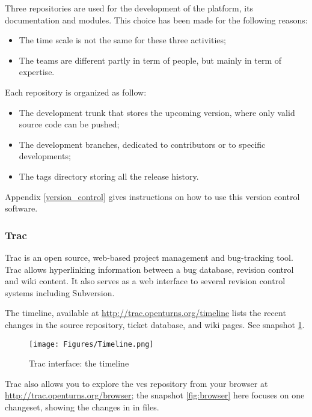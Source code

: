 Three repositories are used for the development of the platform, its documentation and modules. This choice has been made for the following reasons:
\begin{itemize}
\item The time scale is not the same for these three activities;
\item The teams are different partly in term of people, but mainly in term of expertise.
\end{itemize}

Each repository is organized as follow:
\begin{itemize}
\item The development trunk that stores the upcoming version, where only valid source code can be pushed;
\item The development branches, dedicated to contributors or to specific developments;
\item The tags directory storing all the release history.
\end{itemize}

Appendix \ref{version_control} gives instructions on how to use this version control software.

\subsubsection{Trac}

Trac is an open source, web-based project management and bug-tracking tool. Trac allows hyperlinking information between a bug database, revision control and wiki content. It also serves as a web interface to several revision control systems including Subversion.

The timeline, available at \url{http://trac.openturns.org/timeline} lists the recent changes in the source repository, ticket database, and wiki pages. See snapshot \ref{fig:timeline}.

\begin{figure}[ht]
\begin{center}
\texttt{[image: Figures/Timeline.png]}
\caption{Trac interface: the timeline}\label{fig:timeline}
\end{center}
\end{figure}

Trac also allows you to explore the vcs repository from your browser at \url{http://trac.openturns.org/browser}; the snapshot \ref{fig:browser} here focuses on one changeset, showing the changes in in files.


